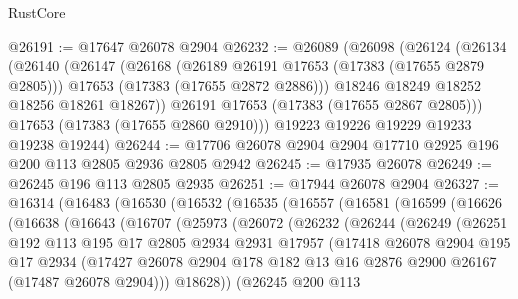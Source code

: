 \begin{lexlean}{RustCore}
\begin{coremodule}
@26191 := @17647 @26078 @2904
@26232 := @26089
    (@26098
      (@26124
        (@26134
          (@26140
            (@26147
              (@26168
                (@26189 @26191 @17653 (@17383 (@17655 @2879 @2805)))
                @17653
                (@17383 (@17655 @2872 @2886)))
              @18246
              @18249
              @18252
              @18256
              @18261
              @18267))
          @26191
          @17653
          (@17383 (@17655 @2867 @2805)))
        @17653
        (@17383 (@17655 @2860 @2910)))
      @19223
      @19226
      @19229
      @19233
      @19238
      @19244)
@26244 := @17706 @26078 @2904 @2904 @17710 @2925 @196 @200 @113 @2805 @2936 @2805 @2942
@26245 := @17935 @26078
@26249 := @26245 @196 @113 @2805 @2935
@26251 := @17944 @26078 @2904
@26327 := @16314
    (@16483
      (@16530
        (@16532
          (@16535
            (@16557
              (@16581
                (@16599
                  (@16626
                    (@16638
                      (@16643
                        (@16707
                          (@25973
                            (@26072
                              (@26232
                                (@26244
                                  (@26249
                                    (@26251
                                      @192
                                      @113
                                      @195
                                      @17
                                      @2805
                                      @2934
                                      @2931
                                      @17957
                                      (@17418
                                        @26078
                                        @2904
                                        @195
                                        @17
                                        @2934
                                        (@17427
                                          @26078
                                          @2904
                                          @178
                                          @182
                                          @13
                                          @16
                                          @2876
                                          @2900
                                          @26167
                                          (@17487 @26078 @2904)))
                                      @18628))
                                  (@26245
                                    @200
                                    @113

\end{coremodule}
\end{lexlean}
